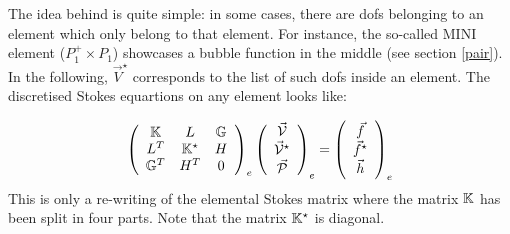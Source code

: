 
The idea behind  is quite simple: in some cases, there are dofs 
belonging to an element which only belong to that element. For instance, the so-called MINI 
element ($P_1^+ \times P_1$) showcases a bubble function in the middle (see section \ref{pair}). 
In the following, $\vec{V}^\star$ corresponds to the list of such dofs inside an element.
The discretised Stokes equartions on any element looks like:

\begin{equation}
\left(
\begin{array}{ccc}
{\mathbb{K}}   & L & {\mathbb{G}} \\
L^T & {\mathbb{K}}^\star  & H \\
{\mathbb{G}}^T & H^T & 0
\end{array}
\right)_e
\left(
\begin{array}{c}
\vec{\cal V} \\ \vec{\cal V}^\star \\ \vec{\cal P}
\end{array}
\right)_e
=
\left(
\begin{array}{c}
\vec{f} \\ \vec{f}^\star \\ \vec{h}
\end{array}
\right)_e
\end{equation}
This is only a re-writing of the elemental Stokes matrix where the matrix ${\mathbb{K}}$ has been 
split in four parts.
Note that the matrix ${\mathbb{K}}^\star$ is diagonal.

